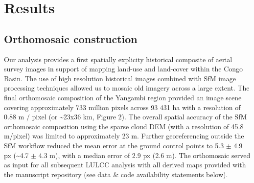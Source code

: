 \documentclass[remote sensing,article,submit,moreauthors,pdftex]{mdpi}
\begin{document}
\hypertarget{results}{%
\section{Results}\label{results}}

\hypertarget{orthomosaic-construction}{%
\subsection{Orthomosaic construction}\label{orthomosaic-construction}}

Our analysis provides a first spatially explicity historical composite
of aerial survey images in support of mapping land-use and land-cover
within the Congo Basin. The use of high resolution historical images
combined with SfM image processing techniques allowed us to mosaic old
imagery across a large extent. The final orthomosaic composition of the
Yangambi region provided an image scene covering approximately 733
million pixels across 93 431 ha with a resolution of 0.88 m / pixel (or
\textasciitilde{}23x36 km, Figure 2). The overall spatial accuracy of
the SfM orthomosaic composition using the sparse cloud DEM (with a
resolution of 45.8 m/pixel) was limited to approximately 23 m. Further
georeferencing outside the SfM workflow reduced the mean error at the
ground control points to 5.3 \(\pm\) 4.9 px (\textasciitilde{}4.7
\(\pm\) 4.3 m), with a median error of 2.9 px (2.6 m). The orthomosaic
served as input for all subsequent LULCC analysis with all derived maps
provided with the manuscript repository (see data \& code availability
statements below).
\end{document}
